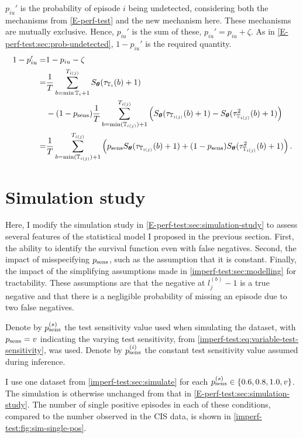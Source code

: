 \documentclass[thesis.tex]{subfiles}
\begin{document}
$p_{iu}'$ is the probability of episode $i$ being undetected, considering both the mechanisms from \cref{E-perf-test} and the new mechanism here.
These mechanisms are mutually exclusive.
Hence, $p_{iu}'$ is the sum of these, $p_{iu}' = p_{iu} + \zeta$.
As in \cref{E-perf-test:sec:prob-undetected}, $1 - p_{iu}'$ is the required quantity.
\begin{align}
1 - p_{iu}'
=& 1 - p_{iu} - \zeta \\
=& \frac{1}{T} \sum_{b = \min \mathbb{T}_{i} + 1}^{T_{i(j)}} S_{\bm{\theta}}(\tau_{\mathbb{T}_{i}}(b) + 1) \\
&- (1 - p_\text{sens})\frac{1}{T} \sum_{b=\min(\mathbb{T}_{i(j)}) + 1}^{T_{i(j)}} \left( S_{\bm{\theta}}(\tau_{\mathbb{T}_{i(j)}}(b) + 1) - S_{\bm{\theta}}(\tau^2_{\mathbb{T}_{i(j)}}(b) + 1) \right) \\
=& \frac{1}{T} \sum_{b=\min(\mathbb{T}_{i(j)}) + 1}^{T_{i(j)}} \left( p_\text{sens} S_{\bm{\theta}}(\tau_{\mathbb{T}_{i(j)}}(b) + 1) + (1 - p_\text{sens}) S_{\bm{\theta}}(\tau^2_{\mathbb{T}_{i(j)}}(b) + 1)\right).
\label{imperf-test:eq:pit-prime}
\end{align}

\section{Simulation study} \label{imperf-test:sec:sim-study-results}

Here, I modify the simulation study in \cref{E-perf-test:sec:simulation-study} to assess several features of the statistical model I proposed in the previous section.
First, the ability to identify the survival function even with false negatives.
Second, the impact of misspecifying $p_\text{sens}$, such as the assumption that it is constant.
Finally, the impact of the simplifying assumptions made in \cref{imperf-test:sec:modelling} for tractability.
These assumptions are that the negative at $l^{(b)}_j - 1$ is a true negative and that there is a negligible probability of missing an episode due to two false negatives.

Denote by $p_\text{sens}^{(s)}$ the test sensitivity value used when simulating the dataset, with $p_\text{sens} = v$ indicating the varying test sensitivity, from \cref{imperf-test:eq:variable-test-sensitivity}, was used.
Denote by $p_\text{sens}^{(i)}$ the constant test sensitivity value assumed during inference.

I use one dataset from \cref{imperf-test:sec:simulate} for each $p_\text{sens}^{(s)} \in \{ 0.6, 0.8, 1.0, v \}$.
The simulation is otherwise unchanged from that in \cref{E-perf-test:sec:simulation-study}.
The number of single positive episodes in each of these conditions, compared to the number observed in the CIS data, is shown in \cref{imperf-test:fig:sim-single-pos}.
\end{document}
